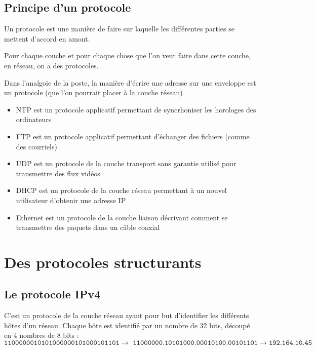 \subsection{Principe d'un protocole}

\begin{definition}[protocole]
	Un protocole est une manière de faire sur laquelle les différentes parties se mettent d'accord en amont.
\end{definition}

Pour chaque couche et pour chaque chose que l'on veut faire dans cette couche, en réseau, on a des protocoles.

\begin{example}
	Dans l'analgoie de la poste, la manière d'écrire une adresse sur une enveloppe est un protocole  (que l'on pourrait placer à la couche réseau)
\end{example}

\begin{example}
	\begin{itemize}
		\item NTP est un protocole applicatif permettant de syncrhoniser les horologes des ordinateurs
		
		\item FTP est un protocole applicatif permettant d'échanger des fichiers (comme des courriels)
		
		\item UDP est un protocole de la couche transport sans garantie utilisé pour transmettre des flux vidéos
		
		\item DHCP est un protocole de la couche réseau permettant à un nouvel utilisateur d'obtenir une adresse IP
		
		\item Ethernet est un protocole de la couche liaison décrivant comment se transmettre des paquets dans un câble coaxial
	\end{itemize}
\end{example}

\section{Des protocoles structurants}

\subsection{Le protocole IPv4}

C'est un protocole de la couche réseau ayant pour but d'identifier les différents hôtes d'un réseau. Chaque hôte est identifié par un nombre de 32 bits, découpé en  4 nombres de 8 bits :
$$\texttt{1100000010101000000101000101101} \to \texttt{ 11000000.10101000.00010100.00101101} \to \texttt{192.164.10.45}$$


